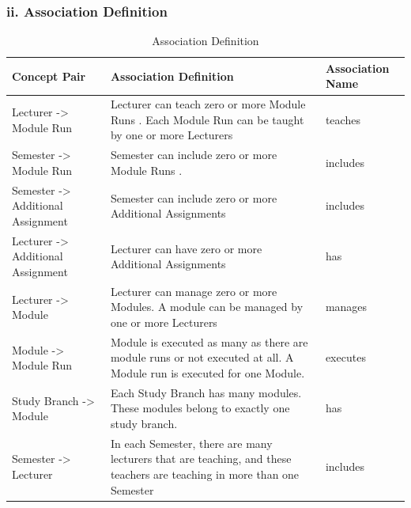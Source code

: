 \documentclass{scrartcl}
\begin{document}
	    \subsubsection{ii. Association Definition}
	    \begin{table}[H]
\begin{center}
\begin{tabular}{| p{6.5cm}| p{6.5cm} |p{2.5cm}|}

\hline
\rowcolor{LightCyan}
\textbf{Concept Pair} & \textbf{Association Definition}& \textbf{Association Name} \\
\hline
Lecturer -> Module Run                    &    Lecturer can teach zero or        more Module Runs . Each Module Run can be taught by  one or more Lecturers 	& teaches\\ \hline

Semester -> Module Run                    &      Semester can include zero or more Module Runs  .    	& includes\\ \hline

Semester -> Additional Assignment     &     Semester can include zero or more Additional Assignments      & includes\\ \hline

Lecturer -> Additional Assignment                    &    Lecturer can have zero or more Additional Assignments 	& has\\ \hline

Lecturer -> Module                    &             Lecturer can manage zero or more Modules. A module can be managed by one or more Lecturers	& manages\\ \hline

Module -> Module Run                    &    Module is executed as many
as there are module runs or not executed at all.
A Module run is executed for one Module.& executes \\ \hline

Study Branch -> Module                    &   Each Study Branch has many modules. These modules belong to exactly one study branch.  & has\\ \hline
  Semester -> Lecturer                  &      In each Semester, there are many lecturers that are teaching, and these teachers are teaching in more than one Semester       & includes\\ \hline
  

\end{tabular}
\end{center}
\caption{Association Definition}
\label{table2}
\end{table}
\end{document}
